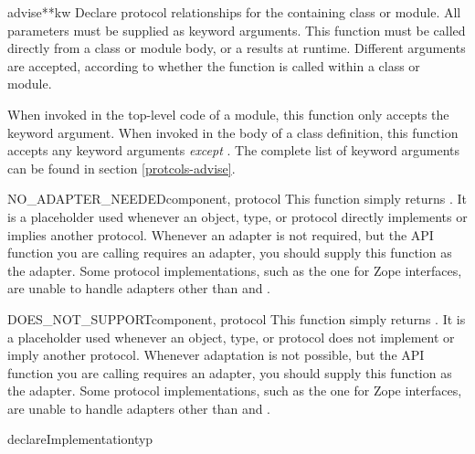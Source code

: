 \begin{verbatim%
}
\begin{verbatim%
}
\begin{verbatim%
}
\begin{verbatim%
}
\begin{verbatim%
}
\begin{verbatim%
}
\begin{funcdesc}{advise}{**kw}
Declare protocol relationships for the containing class or module.  All
parameters must be supplied as keyword arguments.  This function must be
called directly from a class or module body, or a 
results at runtime.  Different arguments are accepted, according to whether
the function is called within a class or module.

When invoked in the top-level code of a module, this function only accepts
the  keyword argument.  When invoked in the body of a
class definition, this function accepts any keyword arguments \emph{except}
.  The complete list of keyword arguments can be found
in section \ref{protcols-advise}.

\end{funcdesc}


\begin{funcdesc}{NO_ADAPTER_NEEDED}{component, protocol}
This function simply returns .  It is a placeholder used whenever
an object, type, or protocol directly implements or implies another protocol.
Whenever an adapter is not required, but the  API function
you are calling requires an adapter, you should supply this function as the
adapter.  Some protocol implementations, such as the one for Zope interfaces,
are unable to handle adapters other than  and
.
\end{funcdesc}


\begin{funcdesc}{DOES_NOT_SUPPORT}{component, protocol}
This function simply returns .  It is a placeholder used whenever
an object, type, or protocol does not implement or imply another protocol.
Whenever adaptation is not possible, but the  API function
you are calling requires an adapter, you should supply this function as the
adapter.  Some protocol implementations, such as the one for Zope interfaces,
are unable to handle adapters other than  and
.
\end{funcdesc}

\begin{funcdesc}{declareImplementation}{typ
 }


\end{funcdesc}
\end{verbatim%
}
\end{verbatim%
}
\end{verbatim%
}
\end{verbatim%
}
\end{verbatim%
}
\end{verbatim%
}
